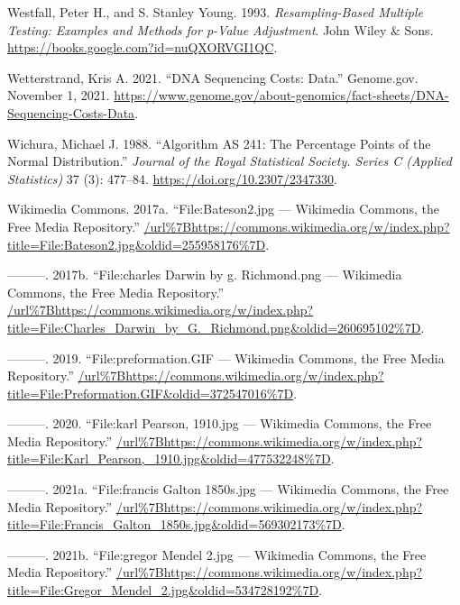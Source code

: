\documentclass[
]{book}
\newlength{\cslhangindent}
\newlength{\cslentryspacingunit} %
\newenvironment{CSLReferences}[2] %
 {%
  \setlength{\parindent}{0pt}
  \ifodd #1
  \let\oldpar\par
  \def\par{\hangindent=\cslhangindent\oldpar}
  \fi
  \setlength{\parskip}{#2\cslentryspacingunit}
 }%
 {}
\begin{document}
\begin{CSLReferences}{1}{0}
\leavevmode{}%
Westfall, Peter H., and S. Stanley Young. 1993. \emph{Resampling-{Based Multiple Testing}: {Examples} and {Methods} for p-{Value Adjustment}}. {John Wiley \& Sons}. \url{https://books.google.com?id=nuQXORVGI1QC}.

\leavevmode{}%
Wetterstrand, Kris A. 2021. {``{DNA Sequencing Costs}: {Data}.''} {Genome.gov}. November 1, 2021. \url{https://www.genome.gov/about-genomics/fact-sheets/DNA-Sequencing-Costs-Data}.

\leavevmode{}%
Wichura, Michael J. 1988. {``Algorithm {AS} 241: {The Percentage Points} of the {Normal Distribution}.''} \emph{Journal of the Royal Statistical Society. Series C (Applied Statistics)} 37 (3): 477--84. \url{https://doi.org/10.2307/2347330}.

\leavevmode{}%
Wikimedia Commons. 2017a. {``File:Bateson2.jpg --- Wikimedia Commons{,} the Free Media Repository.''} \url{/url\%7Bhttps://commons.wikimedia.org/w/index.php?title=File:Bateson2.jpg\&oldid=255958176\%7D}.

\leavevmode{}%
---------. 2017b. {``File:charles Darwin by g. Richmond.png --- Wikimedia Commons{,} the Free Media Repository.''} \url{/url\%7Bhttps://commons.wikimedia.org/w/index.php?title=File:Charles_Darwin_by_G._Richmond.png\&oldid=260695102\%7D}.

\leavevmode{}%
---------. 2019. {``File:preformation.GIF --- Wikimedia Commons{,} the Free Media Repository.''} \url{/url\%7Bhttps://commons.wikimedia.org/w/index.php?title=File:Preformation.GIF\&oldid=372547016\%7D}.

\leavevmode{}%
---------. 2020. {``File:karl Pearson, 1910.jpg --- Wikimedia Commons{,} the Free Media Repository.''} \url{/url\%7Bhttps://commons.wikimedia.org/w/index.php?title=File:Karl_Pearson,_1910.jpg\&oldid=477532248\%7D}.

\leavevmode{}%
---------. 2021a. {``File:francis Galton 1850s.jpg --- Wikimedia Commons{,} the Free Media Repository.''} \url{/url\%7Bhttps://commons.wikimedia.org/w/index.php?title=File:Francis_Galton_1850s.jpg\&oldid=569302173\%7D}.

\leavevmode{}%
---------. 2021b. {``File:gregor Mendel 2.jpg --- Wikimedia Commons{,} the Free Media Repository.''} \url{/url\%7Bhttps://commons.wikimedia.org/w/index.php?title=File:Gregor_Mendel_2.jpg\&oldid=534728192\%7D}.


\end{CSLReferences}
\end{document}

